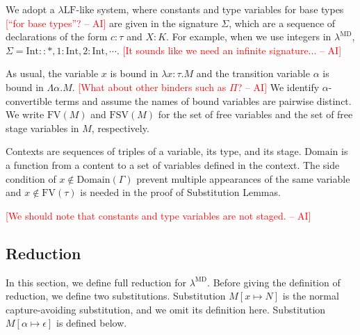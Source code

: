 \documentclass[runningheads]{llncs}
\newcommand{\LMD}{$\lambda^{\textrm{MD}}$\xspace}
\newcommand{\LLF}{$\lambda\textrm{LF}$\xspace}
\newcommand{\G}{\Gamma}
\newcommand{\FV}{\text{FV}}
\newcommand{\FTV}{\text{FSV}}
\newcommand{\I}{\textrm{Int}}
\newcommand{\AI}[1]{\textcolor{red}{[#1 -- AI]}}
\begin{document}

We adopt a \LLF-like system, where constants and type variables for base types \AI{``for base types''?} are given in the signature $\Sigma$, which 
are a sequence of declarations of the form $c:\tau$ and $X:K$.
For example, when we use integers in \LMD, $\Sigma = \I :: *, 1:\I, 2:\I, \cdots$.  \AI{It sounds like we need an infinite signature...}

As usual, the variable $x$ is bound in $\lambda x:\tau.M$
and the transition variable $\alpha$ is bound in $\Lambda \alpha.M$.
\AI{What about other binders such as $\Pi$?}
We identify $\alpha$-convertible terms and assume the names of bound variables are pairwise distinct.
We write $\FV(M)$ and $\FTV(M)$ for the set of free variables and the set of free stage variables in $M$, respectively.

Contexts are sequences of triples of a variable, its type, and its stage.
$\textrm{Domain}$ is a function from a content to a set of variables defined in the context.
The side condition of $x\not\in\textrm{Domain}(\G)$ prevent multiple appearances of the same variable and
$x\not\in\textrm{FV}(\tau)$ is needed in the proof of Substitution Lemmas.

\AI{We should note that constants and type variables are not staged.}
\subsection{Reduction}

In this section, we define full reduction for \LMD.
Before giving the definition of reduction, we define two substitutions.
Substitution $M[x\mapsto N]$ is the normal capture-avoiding substitution, and we omit its definition here.
Substitution $M[\alpha \mapsto \epsilon]$ is defined below.
\end{document}
